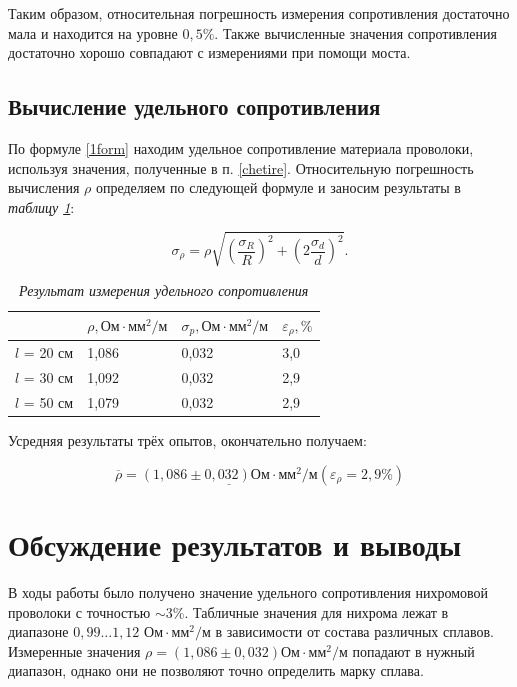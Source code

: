 \documentclass[a4paper,12pt]{article} %
\begin{document}
	
Таким образом, относительная погрешность измерения сопротивления достаточно мала и находится на уровне $ 0,5\% $. Также вычисленные значения сопротивления достаточно хорошо совпадают с измерениями при помощи моста.	

\subsection{Вычисление удельного сопротивления}

По формуле \eqref{1form} находим удельное сопротивление материала проволоки, используя значения, полученные в п. \ref{chetire}. Относительную погрешность вычисления $ \rho $ определяем по следующей формуле и заносим результаты в \textit{таблицу \ref{rezi}}:

\begin{equation}
\sigma_\rho = \rho \sqrt{\left( \frac{\sigma_R}{R}  \right)^2 + \left( 2 \frac{\sigma_d}{d} \right) ^2 }.
\end{equation}

\begin{table}[h]

	\begin{tabular}{|l|l|l|l|}
		\hline
		& $ \rho , \text{Ом} \cdot \text{мм}^2 / \text{м} $   & $ \sigma_p, \text{Ом} \cdot \text{мм}^2 / \text{м} $ & $ \varepsilon_\rho, \% $   \\ \hline
		$l$ = 20 см & 1,086 & 0,032 & 3,0 \\ \hline
		$l$ = 30 см & 1,092 & 0,032 & 2,9 \\ \hline
		$l$ = 50 см & 1,079 & 0,032 & 2,9 \\ \hline
	\end{tabular}
	\caption{\textit{Результат измерения удельного сопротивления}}\label{rezi}
\end{table}


Усредняя результаты трёх опытов, окончательно получаем:

\begin{equation}
\overline{\rho} = \underline{\left( 1,086 \pm 0,032 \right) \text{Ом} \cdot \text{мм}^2 / \text{м}} \left( \varepsilon_\rho = 2,9 \% \right) 
\end{equation}

\section{Обсуждение результатов и выводы}

В ходы работы было получено значение удельного сопротивления нихромовой проволоки с точностью $ \sim 3 \% $. Табличные значения для нихрома лежат в диапазоне $ 0,99 \dots 1,12 \text{ Ом} \cdot \text{мм}^2 / \text{м}$ в зависимости от состава различных сплавов. Измеренные значения $ \rho = \left( 1,086 \pm 0,032 \right) \text{Ом} \cdot \text{мм}^2 / \text{м} $ попадают в нужный диапазон, однако они не позволяют точно определить марку сплава.
\end{document}
